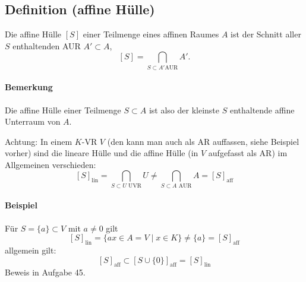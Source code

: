 \subsection{Definition (affine Hülle)}
	\begin{Definition}
		Die affine Hülle $ [S] $ einer Teilmenge eines affinen Raumes $ A $ ist der Schnitt aller $ S $ enthaltenden AUR $ A'\subset A $,
		\[ [S] = \bigcap_{S\subset A' \text{AUR}}A'. \]
	\end{Definition}
	
\paragraph{Bemerkung}
	Die affine Hülle einer Teilmenge $ S\subset A $ ist also der kleinste $ S $ enthaltende affine Unterraum von $ A $.
	
	Achtung: In einem $ K $-VR $ V $ (den kann man auch als AR auffassen, siehe Beispiel vorher) sind die lineare Hülle und die affine Hülle (in $ V $ aufgefasst als AR) im Allgemeinen verschieden:
		\[ [S]_{\text{lin}} = \bigcap_{S\subset U\text{ UVR}}U \neq \bigcap_{S\subset A \text{ AUR}}A = [S]_{\text{aff}} \]
\paragraph{Beispiel}
	Für $ S=\{a\}\subset V $ mit $ a\neq 0 $ gilt
		\[ [S]_{\text{lin}} = \{ax\in A = V\mid x\in K\} \neq \{a\} = [S]_{\text{aff}} \]
	allgemein gilt:
		\[ [S]_{\text{aff}}\subset [S\cup \{0\}]_{\text{aff}}=[S]_{\text{lin}} \]
	Beweis in Aufgabe 45.
	
